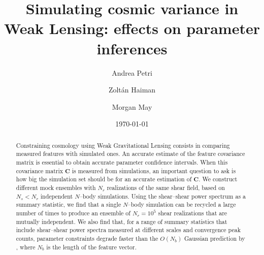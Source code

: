 \documentclass[reprint,aps,prd,superscriptaddress,showkeys,showpacs]{revtex4-1}
\newcommand{\bb}[1]{\mathbf{#1}}
\begin{document}
\title{Simulating cosmic variance in Weak Lensing: effects on parameter inferences}

\author{Andrea Petri}

\author{Zolt\'an Haiman}

\author{Morgan May}

\date{\today}

\label{firstpage}

\begin{abstract}
Constraining cosmology using Weak Gravitational Lensing consists in comparing measured features with simulated ones. An accurate estimate of the feature covariance matrix is essential to obtain accurate parameter confidence intervals. When this covariance matrix $\bb{C}$ is measured from simulations, an important question to ask is how big the simulation set should be for an accurate estimation of $\bb{C}$. We construct different mock ensembles with $N_r$ realizations of the same shear field, based on $N_s<N_r$ independent $N$--body simulations. Using the shear--shear power spectrum as a summary statistic, we find that a single $N$--body simulation can be recycled a large number of times to produce an ensemble of $N_r=10^5$ shear realizations that are mutually independent. We also find that, for a range of summary statistics that include shear--shear power spectra measured at different scales and convergence peak counts, parameter constraints degrade faster than the $O(N_b)$ Gaussian prediction by \citep{DodelsonSchneider13}, where $N_b$ is the length of the feature vector.       
\end{abstract}



\maketitle


\end{document}
